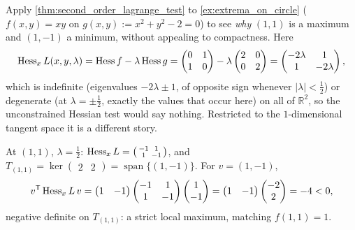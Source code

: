 \begin{example}
\label{ex:second_order_test_on_circle}
Apply \cref{thm:second_order_lagrange_test} to \cref{ex:extrema_on_circle}
($f(x,y)=xy$ on $g(x,y):=x^2+y^2-2=0$) to see \emph{why} $(1,1)$ is a maximum and $(1,-1)$ a
minimum, without appealing to compactness. Here
\[\operatorname{Hess}_xL(x,y,\lambda) = \operatorname{Hess} f - \lambda\operatorname{Hess} g
  = \begin{pmatrix}0&1\\1&0\end{pmatrix} - \lambda\begin{pmatrix}2&0\\0&2\end{pmatrix}
  = \begin{pmatrix}-2\lambda&1\\1&-2\lambda\end{pmatrix},\]
which is indefinite (eigenvalues $-2\lambda\pm1$, of opposite sign whenever $|\lambda|<\tfrac12$)
or degenerate (at $\lambda=\pm\tfrac12$, exactly the values that occur here) on all of
$\mathbb{R}^2$, so the unconstrained Hessian test would say nothing. Restricted to the
$1$-dimensional tangent space it is a different story.

At $(1,1)$, $\lambda=\tfrac12$: $\operatorname{Hess}_xL = \left(\begin{smallmatrix}-1&1\\1&-1\end{smallmatrix}\right)$, and $T_{(1,1)} = \ker\begin{pmatrix}2&2\end{pmatrix} = \operatorname{span}\{(1,-1)\}$. For $v=(1,-1)$,
\[v^{\mathsf{T}}\operatorname{Hess}_xL\,v = \begin{pmatrix}1&-1\end{pmatrix}\begin{pmatrix}-1&1\\1&-1\end{pmatrix}\begin{pmatrix}1\\-1\end{pmatrix} = \begin{pmatrix}1&-1\end{pmatrix}\begin{pmatrix}-2\\2\end{pmatrix} = -4 < 0,\]
negative definite on $T_{(1,1)}$: a strict local maximum, matching $f(1,1)=1$.


\end{example}
